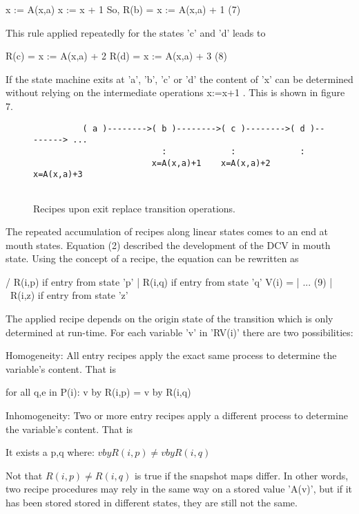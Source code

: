 \documentclass[12pt]{article}
\begin{document}
                   { x := A(x,a) }
                   { x := x + 1 }
So, 
               R(b) = { x := A(x,a) + 1 }                                 (7)

This rule applied repeatedly for the states 'c' and 'd' leads to

               R(c) = { x := A(x,a) + 2 }
               R(d) = { x := A(x,a) + 3 }                                 (8)

If the state machine exits at 'a', 'b', 'c' or 'd' the content of 'x' can be
determined without relying on the intermediate operations { x:=x+1 }. This
is shown in figure 7.
 
\begin{figure}[htbp] \leavevmode
\begin{verbatim}
          ( a )-------->( b )-------->( c )-------->( d )--------> ...
                          :             :             :
                        x=A(x,a)+1    x=A(x,a)+2    x=A(x,a)+3


\end{verbatim}
\caption{Recipes upon exit replace transition operations.}
\end{figure}

The repeated accumulation of recipes along linear states comes to an end at
mouth states.  Equation (2) described the development of the DCV in mouth
state. Using the concept of a recipe, the equation can be rewritten as

                     /  R(i,p)  if entry from state 'p'
                     |  R(i,q)  if entry from state 'q'
            V(i) = |   ...                                                (9)
                     |  
                     \  R(i,z)  if entry from state 'z'

The applied recipe depends on the origin state of the transition which is only
determined at run-time.  For each variable 'v' in 'RV(i)' there are two
possibilities:

   Homogeneity:   All entry recipes apply the exact same process to
                  determine the variable's content. That is

                  for all q,e in P(i): v by R(i,p) = v by R(i,q) 

   Inhomogeneity: Two or more entry recipes apply a different process
                  to determine the variable's content. That is

                  It exists a p,q where: \(v by R(i,p) \neq v by R(i,q)\)

Not that \(R(i,p) \neq R(i,q)\) is true if the snapshot maps differ. In other
words, two recipe procedures may rely in the same way on a stored value 'A(v)',
but if it has been stored stored in different states, they are still not
the same.
\end{document}
